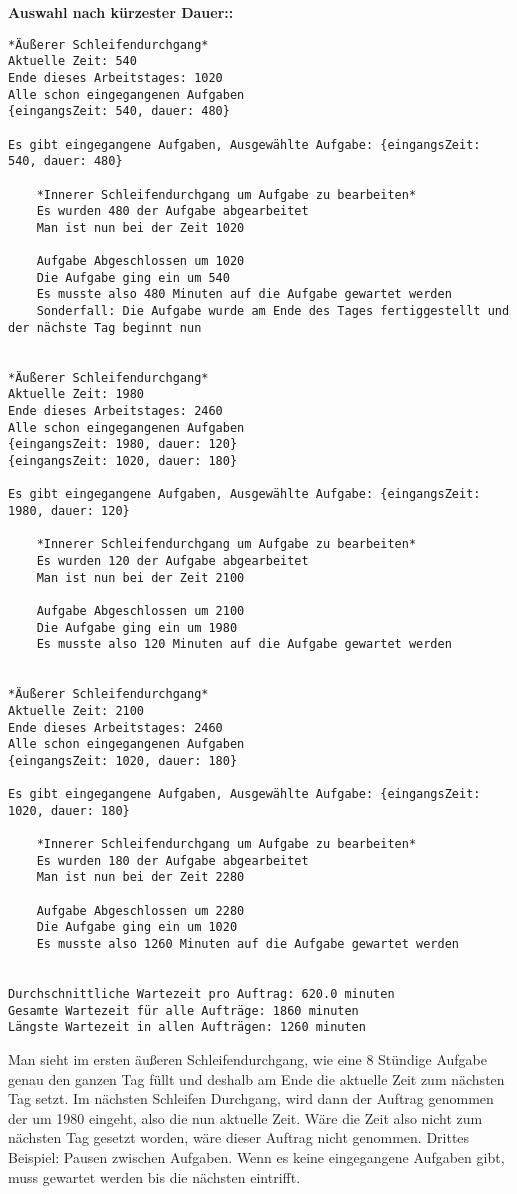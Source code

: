 \documentclass[a4paper,10pt,ngerman]{scrartcl}
\begin{document}
\textbf{ Auswahl nach kürzester Dauer::}
\begin{lstlisting}[numbers=none]
*Äußerer Schleifendurchgang*
Aktuelle Zeit: 540
Ende dieses Arbeitstages: 1020
Alle schon eingegangenen Aufgaben
{eingangsZeit: 540, dauer: 480}

Es gibt eingegangene Aufgaben, Ausgewählte Aufgabe: {eingangsZeit: 540, dauer: 480}

    *Innerer Schleifendurchgang um Aufgabe zu bearbeiten*
    Es wurden 480 der Aufgabe abgearbeitet
    Man ist nun bei der Zeit 1020

    Aufgabe Abgeschlossen um 1020
    Die Aufgabe ging ein um 540
    Es musste also 480 Minuten auf die Aufgabe gewartet werden
    Sonderfall: Die Aufgabe wurde am Ende des Tages fertiggestellt und der nächste Tag beginnt nun


*Äußerer Schleifendurchgang*
Aktuelle Zeit: 1980
Ende dieses Arbeitstages: 2460
Alle schon eingegangenen Aufgaben
{eingangsZeit: 1980, dauer: 120}
{eingangsZeit: 1020, dauer: 180}

Es gibt eingegangene Aufgaben, Ausgewählte Aufgabe: {eingangsZeit: 1980, dauer: 120}

    *Innerer Schleifendurchgang um Aufgabe zu bearbeiten*
    Es wurden 120 der Aufgabe abgearbeitet
    Man ist nun bei der Zeit 2100

    Aufgabe Abgeschlossen um 2100
    Die Aufgabe ging ein um 1980
    Es musste also 120 Minuten auf die Aufgabe gewartet werden


*Äußerer Schleifendurchgang*
Aktuelle Zeit: 2100
Ende dieses Arbeitstages: 2460
Alle schon eingegangenen Aufgaben
{eingangsZeit: 1020, dauer: 180}

Es gibt eingegangene Aufgaben, Ausgewählte Aufgabe: {eingangsZeit: 1020, dauer: 180}

    *Innerer Schleifendurchgang um Aufgabe zu bearbeiten*
    Es wurden 180 der Aufgabe abgearbeitet
    Man ist nun bei der Zeit 2280

    Aufgabe Abgeschlossen um 2280
    Die Aufgabe ging ein um 1020
    Es musste also 1260 Minuten auf die Aufgabe gewartet werden


Durchschnittliche Wartezeit pro Auftrag: 620.0 minuten
Gesamte Wartezeit für alle Aufträge: 1860 minuten
Längste Wartezeit in allen Aufträgen: 1260 minuten
\end{lstlisting}

Man sieht im ersten äußeren Schleifendurchgang,
wie eine 8 Stündige Aufgabe genau den ganzen Tag füllt
und deshalb am Ende die aktuelle Zeit zum nächsten Tag setzt.
Im nächsten Schleifen Durchgang,
wird dann der Auftrag genommen der um 1980 eingeht, also die nun aktuelle Zeit.
Wäre die Zeit also nicht zum nächsten Tag gesetzt worden,
wäre dieser Auftrag nicht genommen.
Drittes Beispiel: Pausen zwischen Aufgaben. Wenn es keine eingegangene Aufgaben gibt,
muss gewartet werden bis die nächsten eintrifft.
\end{document}
